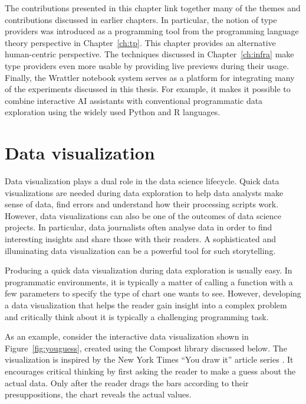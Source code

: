 \documentclass[fleqn,11pt]{report}
\theoremstyle{definition}
\begin{document}
The contributions presented in this chapter link together many of the themes and contributions
discussed in earlier chapters. In particular, the notion of type providers was introduced
as a programming tool from the programming language theory perspective in Chapter~\ref{ch:tp}.
This chapter provides an alternative human-centric perspective. The techniques discussed
in Chapter~\ref{ch:infra} make type providers even more usable by providing live previews during
their usage. Finally, the Wrattler notebook system serves as a platform for integrating
many of the experiments discussed in this thesis. For example, it makes it possible to combine
interactive AI assistants with conventional programmatic data exploration using the widely
used Python and R languages.



\chapter{Data visualization}

Data visualization plays a dual role in the data science lifecycle. Quick data
visualizations are needed during data exploration to help data analysts make sense of
data, find errors and understand how their processing scripts work. However, data visualizations
can also be one of the outcomes of data science projects. In particular, data journalists
often analyse data in order to find interesting insights and share those with their readers.
A sophisticated and illuminating data visualization can be a powerful tool for such storytelling.

Producing a quick data visualization during data exploration is usually easy. In programmatic
environments, it is typically a matter of calling a function with a few parameters to specify
the type of chart one wants to see. However, developing a data visualization that helps
the reader gain insight into a complex problem and critically think about it is typically
a challenging programming task.

As an example, consider the interactive data visualization shown in Figure~\ref{fig:youguess},
created using the Compost library discussed below. The visualization is inspired by the New York
Times ``You draw it'' article series \citep{aisch-2015-youdraw}.
It encourages critical thinking by first asking the reader to make a guess
about the actual data. Only after the reader drags the bars according to their presuppositions, the
chart reveals the actual values.
\end{document}
